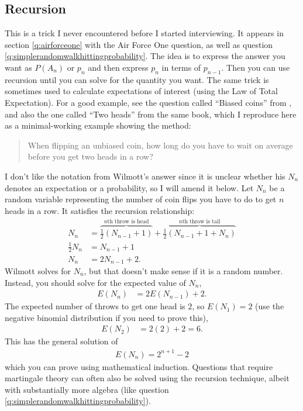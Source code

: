 \documentclass[a4paper]{article}
\begin{document}
\subsection{Recursion}
This is a trick I never encountered before I started interviewing.
It appears in section \ref{q:airforceone} with the Air Force One question, as well as question \ref{q:simplerandomwalkhittingprobability}.
The idea is to express the answer you want as $P(A_n)$ or $p_n$ and then express $p_n$ in terms of $p_{n-1}$.
Then you can use recursion until you can solve for the quantity you want.
The same trick is sometimes used to calculate expectations of interest (using the Law of Total Expectation).
For a good example, see the question called ``Biased coins'' from \citet{WilmottFAQ}, and also the one called ``Two heads'' from the same book, which I reproduce here as a minimal-working example showing the method:

\begin{quote}
 When flipping an unbiased coin, how long do you have to wait on average before you get two heads in a row?
\end{quote}
I don't like the notation from Wilmott's answer since it is unclear whether his $N_n$ denotes an expectation or a probability, so I will amend it below.
Let $N_n$ be a random variable representing the number of coin flips you have to do to get $n$ heads in a row.
It satisfies the recursion relationship:
\begin{align*}
  N_n &=
  \overbrace{ \frac{1}{2} (N_{n-1} + 1)}^{n\text{th throw is head}}
  +
  \overbrace{\frac{1}{2} (N_{n-1} + 1 + N_n)}^{n\text{th throw is tail}}
  \\
  \frac{1}{2}  N_n &=
   N_{n-1} + 1
  \\
  N_n &=
  2 N_{n-1} + 2
  \text{.}
\end{align*}
Wilmott solves for $N_n$, but that doesn't make sense if it is a random number.
Instead, you should solve for the expected value of $N_n$,
\begin{align*}
  E(N_n) &= 2 E(N_{n-1}) + 2
  \text{.}
\end{align*}
The expected number of throws to get one head is $2$, so
$E(N_1) = 2$ (use the negative binomial distribution if you need to prove this),
\begin{align*}
  E(N_2) &= 2(2) + 2 = 6
  \text{.}
\end{align*}
This has the general solution of
\begin{align*}
  E(N_n) = 2^{n+1} - 2
\end{align*}
which you can prove using mathematical induction.
Questions that require martingale theory can often also be solved using the recursion technique, albeit with substantially more algebra (like question \ref{q:simplerandomwalkhittingprobability}).
\end{document}
